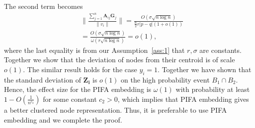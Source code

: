 \documentclass{article} \usepackage{iclr2022_conference,times}
\begin{document}
The second term becomes
\begin{align}
	&  \| \frac{\sum_{j=1}^n\mathbf{A}_{ij}\mathbf{G}_j}{\|v_i\|} \| = \frac{O(\sigma\sqrt{n\log n})}{\frac{n}{2}r|p-q|(1+o(1))}\\
	& = \frac{O(\sigma\sqrt{n\log n})}{\omega(r\sqrt{n\log n})} = o(1),
\end{align}
where the last equality is from our Assumption~\ref{ass:1} that $r,\sigma$ are constants. Together we show that the deviation of nodes from their centroid is of scale $o(1)$. The similar result holds for the case $y_i=1$. Together we have shown that the standard deviation of $\mathbf{Z_i}$ is $o(1)$ on the high probability event $B_1\cap B_2$. Hence, the effect size for the PIFA embedding is $\omega(1)$ with probability at least $1-O(\frac{1}{n^{c_2}})$ for some constant $c_2>0$, which implies that PIFA embedding gives a better clustered node representation. Thus, it is preferable to use PIFA embedding and we complete the proof.
\end{document}
